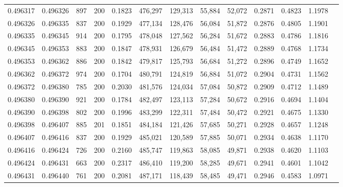 \begin{tabular}{rrrrrrrrrrrrr}
0.496317 & 0.496326 &   897 & 200 &                                     0.1823 & 476,297 & 129,313 &  55,884 &  52,072 & 0.2871 & 0.4823 & 1.1978 \\
0.496326 & 0.496335 &   837 & 200 &                                     0.1929 & 477,134 & 128,476 &  56,084 &  51,872 & 0.2876 & 0.4805 & 1.1901 \\
0.496335 & 0.496345 &   914 & 200 &                                     0.1795 & 478,048 & 127,562 &  56,284 &  51,672 & 0.2883 & 0.4786 & 1.1816 \\
0.496345 & 0.496353 &   883 & 200 &                                     0.1847 & 478,931 & 126,679 &  56,484 &  51,472 & 0.2889 & 0.4768 & 1.1734 \\
0.496353 & 0.496362 &   886 & 200 &                                     0.1842 & 479,817 & 125,793 &  56,684 &  51,272 & 0.2896 & 0.4749 & 1.1652 \\
0.496362 & 0.496372 &   974 & 200 &                                     0.1704 & 480,791 & 124,819 &  56,884 &  51,072 & 0.2904 & 0.4731 & 1.1562 \\
0.496372 & 0.496380 &   785 & 200 &                                     0.2030 & 481,576 & 124,034 &  57,084 &  50,872 & 0.2909 & 0.4712 & 1.1489 \\
0.496380 & 0.496390 &   921 & 200 &                                     0.1784 & 482,497 & 123,113 &  57,284 &  50,672 & 0.2916 & 0.4694 & 1.1404 \\
0.496390 & 0.496398 &   802 & 200 &                                     0.1996 & 483,299 & 122,311 &  57,484 &  50,472 & 0.2921 & 0.4675 & 1.1330 \\
0.496398 & 0.496407 &   885 & 201 &                                     0.1851 & 484,184 & 121,426 &  57,685 &  50,271 & 0.2928 & 0.4657 & 1.1248 \\
0.496407 & 0.496416 &   837 & 200 &                                     0.1929 & 485,021 & 120,589 &  57,885 &  50,071 & 0.2934 & 0.4638 & 1.1170 \\
0.496416 & 0.496424 &   726 & 200 &                                     0.2160 & 485,747 & 119,863 &  58,085 &  49,871 & 0.2938 & 0.4620 & 1.1103 \\
0.496424 & 0.496431 &   663 & 200 &                                     0.2317 & 486,410 & 119,200 &  58,285 &  49,671 & 0.2941 & 0.4601 & 1.1042 \\
0.496431 & 0.496440 &   761 & 200 &                                     0.2081 & 487,171 & 118,439 &  58,485 &  49,471 & 0.2946 & 0.4583 & 1.0971 \\

\end{tabular}
